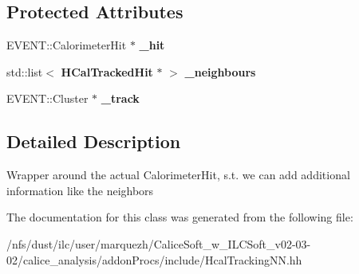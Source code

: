 \subsection*{Protected Attributes}
\begin{DoxyCompactItemize}
\item 
E\-V\-E\-N\-T\-::\-Calorimeter\-Hit $\ast$ {\bfseries \-\_\-hit}\label{classHCalTrackingNNProcessor_1_1HCalTrackedHit_a256ad292c6ca6640e1930a9150811068}

\item 
std\-::list$<$ {\bf H\-Cal\-Tracked\-Hit} $\ast$ $>$ {\bfseries \-\_\-neighbours}\label{classHCalTrackingNNProcessor_1_1HCalTrackedHit_ae82af8afc010694eed261e0fbf0bebc1}

\item 
E\-V\-E\-N\-T\-::\-Cluster $\ast$ {\bfseries \-\_\-track}\label{classHCalTrackingNNProcessor_1_1HCalTrackedHit_ae36cf46d6ede64087b3f83da3bd97c88}

\end{DoxyCompactItemize}


\subsection{Detailed Description}
Wrapper around the actual Calorimeter\-Hit, s.\-t. we can add additional information like the neighbors 

The documentation for this class was generated from the following file\-:\begin{DoxyCompactItemize}
\item 
/nfs/dust/ilc/user/marquezh/\-Calice\-Soft\-\_\-w\-\_\-\-I\-L\-C\-Soft\-\_\-v02-\/03-\/02/calice\-\_\-analysis/addon\-Procs/include/Hcal\-Tracking\-N\-N.\-hh\end{DoxyCompactItemize}
